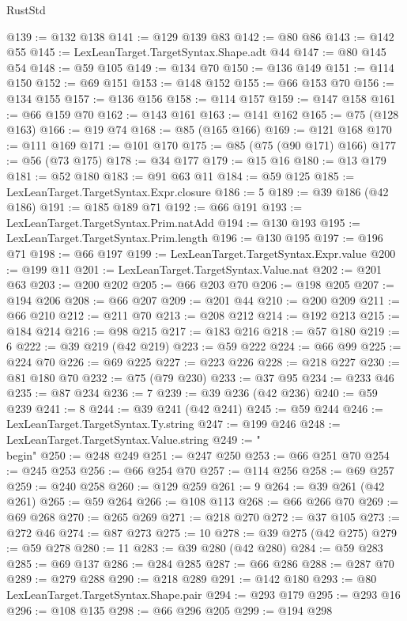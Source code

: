 \begin{lexlean}{RustStd}
\begin{coremodule}
{\begin{coremodule}
{{{{{{{{{{{{{{{{{{{{{{{{{{{{{{{{{{{{{{{{{{{@139 := @132 @138
@141 := @129 @139 @83
@142 := @80 @86
@143 := @142 @55
@145 := LexLeanTarget.TargetSyntax.Shape.adt @44
@147 := @80 @145 @54
@148 := @59 @105
@149 := @134 @70
@150 := @136 @149
@151 := @114 @150
@152 := @69 @151
@153 := @148 @152
@155 := @66 @153 @70
@156 := @134 @155
@157 := @136 @156
@158 := @114 @157
@159 := @147 @158
@161 := @66 @159 @70
@162 := @143 @161
@163 := @141 @162
@165 := @75 (@128 @163)
@166 := @19 @74
@168 := @85 (@165 @166)
@169 := @121 @168
@170 := @111 @169
@171 := @101 @170
@175 := @85 (@75 (@90 @171) @166)
@177 := @56 (@73 @175)
@178 := @34 @177
@179 := @15 @16
@180 := @13 @179
@181 := @52 @180
@183 := @91 @63 @11
@184 := @59 @125
@185 := LexLeanTarget.TargetSyntax.Expr.closure
@186 := 5
@189 := @39 @186 (@42 @186)
@191 := @185 @189 @71
@192 := @66 @191
@193 := LexLeanTarget.TargetSyntax.Prim.natAdd
@194 := @130 @193
@195 := LexLeanTarget.TargetSyntax.Prim.length
@196 := @130 @195
@197 := @196 @71
@198 := @66 @197
@199 := LexLeanTarget.TargetSyntax.Expr.value
@200 := @199 @11
@201 := LexLeanTarget.TargetSyntax.Value.nat
@202 := @201 @63
@203 := @200 @202
@205 := @66 @203 @70
@206 := @198 @205
@207 := @194 @206
@208 := @66 @207
@209 := @201 @44
@210 := @200 @209
@211 := @66 @210
@212 := @211 @70
@213 := @208 @212
@214 := @192 @213
@215 := @184 @214
@216 := @98 @215
@217 := @183 @216
@218 := @57 @180
@219 := 6
@222 := @39 @219 (@42 @219)
@223 := @59 @222
@224 := @66 @99
@225 := @224 @70
@226 := @69 @225
@227 := @223 @226
@228 := @218 @227
@230 := @81 @180 @70
@232 := @75 (@79 @230)
@233 := @37 @95
@234 := @233 @46
@235 := @87 @234
@236 := 7
@239 := @39 @236 (@42 @236)
@240 := @59 @239
@241 := 8
@244 := @39 @241 (@42 @241)
@245 := @59 @244
@246 := LexLeanTarget.TargetSyntax.Ty.string
@247 := @199 @246
@248 := LexLeanTarget.TargetSyntax.Value.string
@249 := "\\begin"
@250 := @248 @249
@251 := @247 @250
@253 := @66 @251 @70
@254 := @245 @253
@256 := @66 @254 @70
@257 := @114 @256
@258 := @69 @257
@259 := @240 @258
@260 := @129 @259
@261 := 9
@264 := @39 @261 (@42 @261)
@265 := @59 @264
@266 := @108 @113
@268 := @66 @266 @70
@269 := @69 @268
@270 := @265 @269
@271 := @218 @270
@272 := @37 @105
@273 := @272 @46
@274 := @87 @273
@275 := 10
@278 := @39 @275 (@42 @275)
@279 := @59 @278
@280 := 11
@283 := @39 @280 (@42 @280)
@284 := @59 @283
@285 := @69 @137
@286 := @284 @285
@287 := @66 @286
@288 := @287 @70
@289 := @279 @288
@290 := @218 @289
@291 := @142 @180
@293 := @80 LexLeanTarget.TargetSyntax.Shape.pair
@294 := @293 @179
@295 := @293 @16
@296 := @108 @135
@298 := @66 @296 @205
@299 := @194 @298
}}}}}}}}}}}}}}}}}}}}}}}}}}}}}}}}}}}}}}}}}}}
\end{coremodule}}
\end{coremodule}
\end{lexlean}
